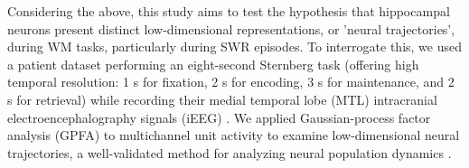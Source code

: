 \indent
Considering the above, this study aims to test the hypothesis that hippocampal neurons present distinct low-dimensional representations, or 'neural trajectories', during WM tasks, particularly during SWR episodes. To interrogate this, we used a patient dataset performing an eight-second Sternberg task (offering high temporal resolution: 1 s for fixation, 2 s for encoding, 3 s for maintenance, and 2 s for retrieval) while recording their medial temporal lobe (MTL) intracranial electroencephalography signals (iEEG) \cite{boran_dataset_2020}. We applied Gaussian-process factor analysis (GPFA) to multichannel unit activity to examine low-dimensional neural trajectories, a well-validated method for analyzing neural population dynamics \cite{yu_gaussian-process_2009}.
\label{sec:introduction}
